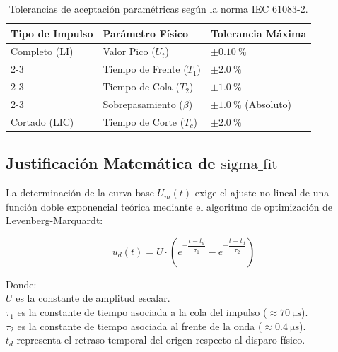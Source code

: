 \begin{table}[H]
    \centering
    \caption{Tolerancias de aceptación paramétricas según la norma IEC 61083-2.}
    \label{tab:tolerancias_iec61083}
    \begin{tabular}{@{}lll@{}}
        \toprule
        \textbf{Tipo de Impulso} & \textbf{Parámetro Físico} & \textbf{Tolerancia Máxima}           \\ \midrule
        Completo (LI)            & Valor Pico ($U_t$)        & $\pm\SI{0,10}{\percent}$             \\ \cmidrule(l){2-3} 
                                 & Tiempo de Frente ($T_1$)  & $\pm\SI{2,0}{\percent}$              \\ \cmidrule(l){2-3} 
                                 & Tiempo de Cola ($T_2$)    & $\pm\SI{1,0}{\percent}$              \\ \cmidrule(l){2-3} 
                                 & Sobrepasamiento ($\beta$) & $\pm\SI{1,0}{\percent}$ (Absoluto)   \\ \midrule
        Cortado (LIC)            & Tiempo de Corte ($T_c$)   & $\pm\SI{2,0}{\percent}$              \\ \bottomrule
    \end{tabular}
\end{table}

\subsection{Justificación Matemática de $\text{sigma\_fit}$}
La determinación de la curva base $U_m(t)$ exige el ajuste no lineal de una función doble exponencial teórica mediante el algoritmo de optimización de Levenberg-Marquardt:

\begin{equation}
u_d(t) = U \cdot \left( e^{-\dfrac{t-t_d}{\tau_1}} - e^{-\dfrac{t-t_d}{\tau_2}} \right)
\label{eq:DobleExponencial}
\end{equation}

Donde:\\
$U$ es la constante de amplitud escalar.\\
$\tau_1$ es la constante de tiempo asociada a la cola del impulso ($\approx \SI{70}{\micro\second}$).\\
$\tau_2$ es la constante de tiempo asociada al frente de la onda ($\approx \SI{0,4}{\micro\second}$).\\
$t_d$ representa el retraso temporal del origen respecto al disparo físico.\vspace{1\baselineskip}

